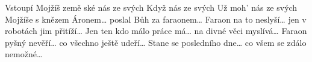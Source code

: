 \begin{TEXT}{Vstoupí Mojžíš}
\REFREN  {}   země ské \NL
{}   nás ze svých  
\SLOKA Když    nás ze svých   \NL
Už moh'     nás ze svých  
\SLOKA Mojžíše s knězem Áronem… \NL
poslal Bůh za faraonem… 
\SLOKA Faraon na to neslyší… \NL
jen v robotách jim přitíží… 
\SLOKA Jen ten kdo málo práce má… \NL
na divné věci myslívá… 
\SLOKA Faraon pyšný nevěří… \NL
co všechno ještě udeří… 
\SLOKA Stane se posledního dne… \NL
co všem se zdálo nemožné… \NL
\end{TEXT}
